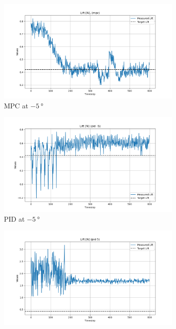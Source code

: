 \begin{figure}[h]
    \centering
    \begin{subfigure}[b]{0.49\textwidth}
        \centering
        \includegraphics[width=\textwidth]{./img/LiftMPC.png}
        \caption{MPC at $\SI{-5}{\degree}$}
    \end{subfigure}
    \begin{subfigure}[b]{0.49\textwidth}
        \centering
        \includegraphics[width=\textwidth]{./img/LiftPID-5.png}
        \caption{PID at $\SI{-5}{\degree}$}
    \end{subfigure}
    \begin{subfigure}[b]{0.49\textwidth}
        \centering
        \includegraphics[width=\textwidth]{./img/LiftPID5.png}

\end{subfigure}
\end{figure}
